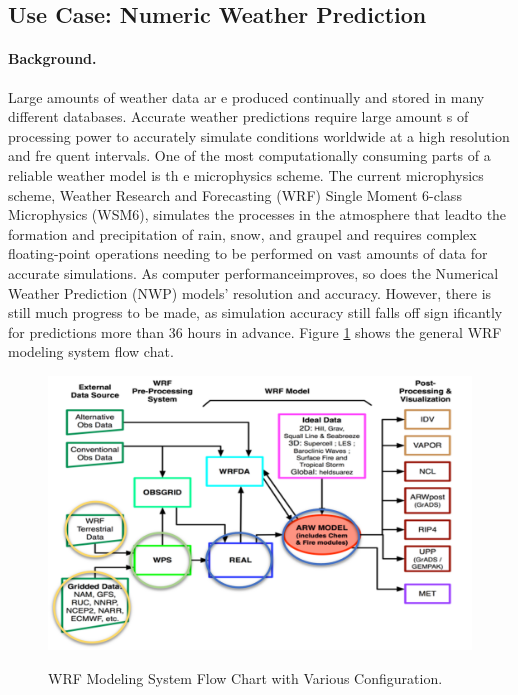 \subsection{Use Case: Numeric Weather Prediction}


\paragraph*{Background.} Large amounts of weather data ar e produced continually and stored in
many different databases.  Accurate weather predictions require large
amount s of processing power to accurately simulate conditions
worldwide at a high resolution and fre quent intervals. One of the
most computationally consuming parts of a reliable weather model is th
e microphysics scheme. The current microphysics scheme, Weather
Research and Forecasting (WRF) Single Moment 6-class Microphysics
(WSM6), simulates the processes in the atmosphere that leadto the
formation and precipitation of rain, snow, and graupel and requires
complex floating-point operations needing to be performed on vast
amounts of data for accurate simulations. As computer
performanceimproves, so does the Numerical Weather Prediction (NWP)
models' resolution and accuracy. However, there is still much progress
to be made, as simulation accuracy still falls off sign ificantly for
predictions more than 36 hours in advance. Figure \ref{fig:weather-1}
shows the general WRF modeling system flow chat.

\begin{figure}[htb]
\centering\includegraphics[width=1.0\columnwidth]{usecase/nwp-arch.png}
\label{fig:weather-1}
\caption{WRF Modeling System Flow Chart with Various Configuration.} 
\end{figure}

